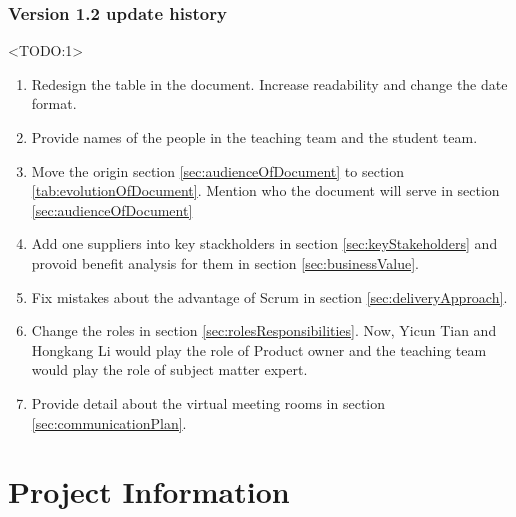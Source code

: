 \documentclass{report}
\begin{document}
\subsection{Version 1.2 update history}
\label{sec:v1-2Up}
<TODO:1>
  \begin{enumerate}
    \item Redesign the table in the document. Increase readability and change the date format.
    \item Provide names of the people in the teaching team and the student team.
    \item Move the origin section \ref{sec:audienceOfDocument} to section \ref{tab:evolutionOfDocument}. Mention who the document will serve in section \ref{sec:audienceOfDocument}
    \item Add one suppliers into key stackholders in section \ref{sec:keyStakeholders} and provoid benefit analysis for them in section \ref{sec:businessValue}.
    \item Fix mistakes about the advantage of Scrum in section \ref{sec:deliveryApproach}.
    \item Change the roles in section \ref{sec:rolesResponsibilities}. Now, Yicun Tian and Hongkang Li would play the role of Product owner and the teaching team would play the role of subject matter expert.
    \item Provide detail about the virtual meeting rooms in section \ref{sec:communicationPlan}.
  \end{enumerate}

\chapter{Project Information}{}
\label{projectInformation}
\end{document}
